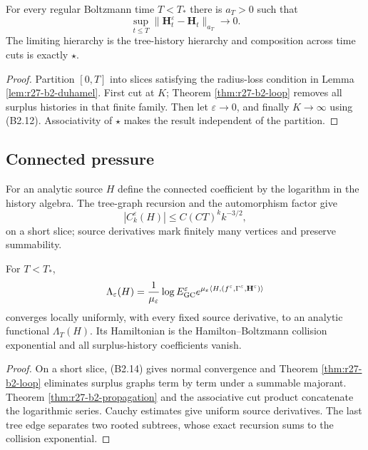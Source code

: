 \begin{theorem}
\label{thm:r27-b2-propagation}
For every regular Boltzmann time $T<T_*$ there is $a_T>0$ such that
\[
 \sup_{t\le T}\|\mathbf H_t^\varepsilon-\mathbf H_t\|_{a_T}\to0.         \tag{B2.13}
\]
The limiting hierarchy is the tree-history hierarchy and composition across
time cuts is exactly $\star$.
\end{theorem}

\begin{proof}
Partition $[0,T]$ into slices satisfying the radius-loss condition in Lemma
\ref{lem:r27-b2-duhamel}.  First cut at $K$; Theorem
\ref{thm:r27-b2-loop} removes all surplus histories in that finite family.
Then let $\varepsilon\to0$, and finally $K\to\infty$ using (B2.12).
Associativity of $\star$ makes the result independent of the partition.
\end{proof}

\subsection{Connected pressure}

For an analytic source $H$ define the connected coefficient by the logarithm
in the history algebra.  The tree-graph recursion and the automorphism factor
give
\[
 |C_k^\varepsilon(H)|\le C(CT)^k k^{-3/2},                \tag{B2.14}
\]
on a short slice; source derivatives mark finitely many vertices and preserve
summability.

\begin{theorem}
\label{thm:r27-b2-pressure}
For $T<T_*$,
\[
 \Lambda_\varepsilon(H)
 ={1\over\mu_\varepsilon}\log
 E_{\rm GC}^\varepsilon e^{\mu_\varepsilon\langle H,
 (f^\varepsilon,\Gamma^\varepsilon,\mathbf H^\varepsilon)\rangle}
\]
converges locally uniformly, with every fixed source derivative, to an
analytic functional $\Lambda_T(H)$.  Its Hamiltonian is the
Hamilton--Boltzmann collision exponential and all surplus-history
coefficients vanish.
\end{theorem}

\begin{proof}
On a short slice, (B2.14) gives normal convergence and Theorem
\ref{thm:r27-b2-loop} eliminates surplus graphs term by term under a summable
majorant.  Theorem \ref{thm:r27-b2-propagation} and the associative cut
product concatenate the logarithmic series.  Cauchy estimates give uniform
source derivatives.  The last tree edge separates two rooted subtrees, whose
exact recursion sums to the collision exponential.
\end{proof}

